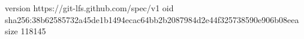version https://git-lfs.github.com/spec/v1
oid sha256:38b62585732a45de1b1494ecac64bb2b2087984d2e44f325738590e906b08eea
size 118145
